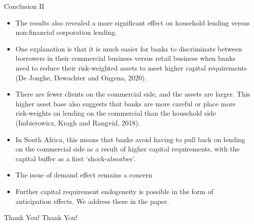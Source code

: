 \documentclass[
  14,
  ignorenonframetext,
  aspectratio=141,
]{beamer}
\providecommand{\tightlist}{%
  \setlength{\itemsep}{0pt}\setlength{\parskip}{0pt}}
\begin{document}
\begin{frame}{Conclusion II}
\protect\hypertarget{conclusion-ii}{}
\begin{itemize}
\tightlist
\item
  The results also revealed a more significant effect on household
  lending versus non-financial corporation lending.
\item
  One explanation is that it is much easier for banks to discriminate
  between borrowers in their commercial business versus retail business
  when banks need to reduce their risk-weighted assets to meet higher
  capital requirements (De Jonghe, Dewachter and Ongena, 2020).
\item
  There are fewer clients on the commercial side, and the assets are
  larger. This higher asset base also suggests that banks are more
  careful or place more risk-weights on lending on the commercial than
  the household side (Imbierowicz, Kragh and Rangvid, 2018).
\item
  In South Africa, this means that banks avoid having to pull back on
  lending on the commercial side as a result of higher capital
  requirements, with the capital buffer as a first `shock-absorber'.
\item
  The issue of demand effect remains a concern
\item
  Further capital requirement endogeneity is possible in the form of
  anticipation effects. We address these in the paper.
\end{itemize}
\end{frame}

\begin{frame}{Thank You!}
\protect\hypertarget{thank-you}{}
\centering Thank You!
\end{frame}
\end{document}
